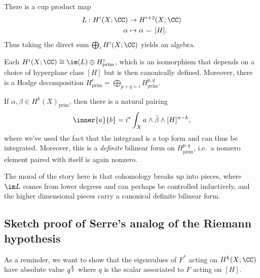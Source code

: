 \begin{fact}

There is a cup product map
\begin{align*}  
L: H^i(X; \CC) &\to H^{i+2}(X; \CC) \\
\alpha &\mapsto \alpha \smile [H]
.\end{align*} Thus taking the direct sum \(\bigoplus_i H^i(X; \CC)\)
yields an algebra.

\end{fact}

\begin{theorem}

Each \(H^i(X; \CC) \cong \im(L) \oplus H^i_{\text{prim}}\), which is an
isomorphism that depends on a choice of hyperplane class \([H]\) but is
then canonically defined. Moreover, there is a Hodge decomposition
\(H^i_{\text{prim}} = \bigoplus_{p+q=i}H^{p, q}_{\text{prim}}\).

\end{theorem}

\begin{theorem}

If \(\alpha, \beta \in H^k(X)_{\text{prim}}\), then there is a natural
pairing
\begin{align*}  
\inner{a}{b} = i^* \int_X a\wedge \bar{\beta} \wedge [H]^{n-k}
,\end{align*} where we've used the fact that the integrand is a top form
and can thus be integrated. Moreover, this is a \emph{definite} bilinear
form on \(H^{p, q}_{\text{prim}}\), i.e.~a nonzero element paired with
itself is again nonzero.

\end{theorem}

The moral of the story here is that cohomology breaks up into pieces,
where \(\im L\) comes from lower degrees and can perhaps be controlled
inductively, and the higher dimensional pieces carry a canonical
definite bilinear form.

\hypertarget{sketch-proof-of-serres-analog-of-the-riemann-hypothesis}{%
\subsection{Sketch proof of Serre's analog of the Riemann
hypothesis}\label{sketch-proof-of-serres-analog-of-the-riemann-hypothesis}}

As a reminder, we want to show that the eigenvalues of \(F^*\) acting on
\(H^k(X; \CC)\) have absolute value \(q^{k\over 2}\) where \(q\) is the
scalar associated to \(F\) acting on \([H]\).


